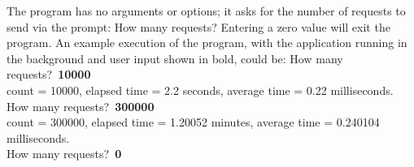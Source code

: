 The program has no arguments or options; it asks for the number of requests to send via
the prompt:
\outputBegin{}
How many requests?
\outputEnd{}
Entering a zero value will exit the program.
An example execution of the program, with the 
application running in the background and user input shown in bold, could be:
\outputBegin{}
How many requests?\ \textbf{10000}\\
count = 10000, elapsed time = 2.2 seconds, average time = 0.22 milliseconds.\\
How many requests?\ \textbf{300000}\\
count = 300000, elapsed time = 1.20052 minutes, average time = 0.240104 milliseconds.\\
How many requests?\ \textbf{0}
\outputEnd{}
\secondaryEnd{}
\primaryEnd{}
